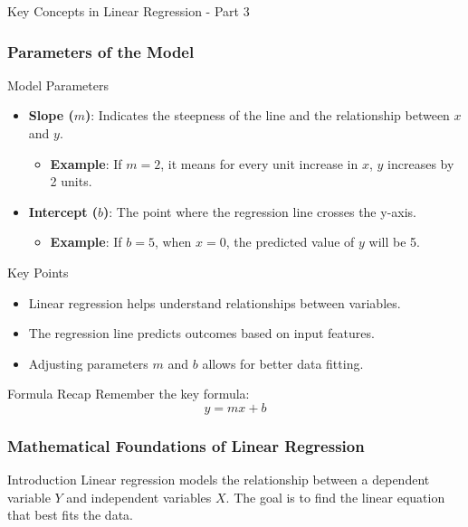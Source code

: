 \documentclass[aspectratio=169]{beamer}
\begin{document}
\begin{frame}[fragile]{Key Concepts in Linear Regression - Part 3}
    \frametitle{Parameters of the Model}

    \begin{block}{Model Parameters}
        \begin{itemize}
            \item \textbf{Slope (\(m\))}: Indicates the steepness of the line and the relationship between \(x\) and \(y\).
                \begin{itemize}
                    \item \textbf{Example}: If \(m = 2\), it means for every unit increase in \(x\), \(y\) increases by 2 units.
                \end{itemize}
            
            \item \textbf{Intercept (\(b\))}: The point where the regression line crosses the y-axis.
                \begin{itemize}
                    \item \textbf{Example}: If \(b = 5\), when \(x = 0\), the predicted value of \(y\) will be 5.
                \end{itemize}
        \end{itemize}
    \end{block}
    
    \begin{block}{Key Points}
        \begin{itemize}
            \item Linear regression helps understand relationships between variables.
            \item The regression line predicts outcomes based on input features.
            \item Adjusting parameters \(m\) and \(b\) allows for better data fitting.
        \end{itemize}
    \end{block}
    
    \begin{block}{Formula Recap}
        Remember the key formula:
        \begin{equation}
            y = mx + b
        \end{equation}
    \end{block}
\end{frame}

\begin{frame}[fragile]
    \frametitle{Mathematical Foundations of Linear Regression}
    \begin{block}{Introduction}
        Linear regression models the relationship between a dependent variable \(Y\) and independent variables \(X\).
        The goal is to find the linear equation that best fits the data.
    \end{block}
\end{frame}
\end{document}
